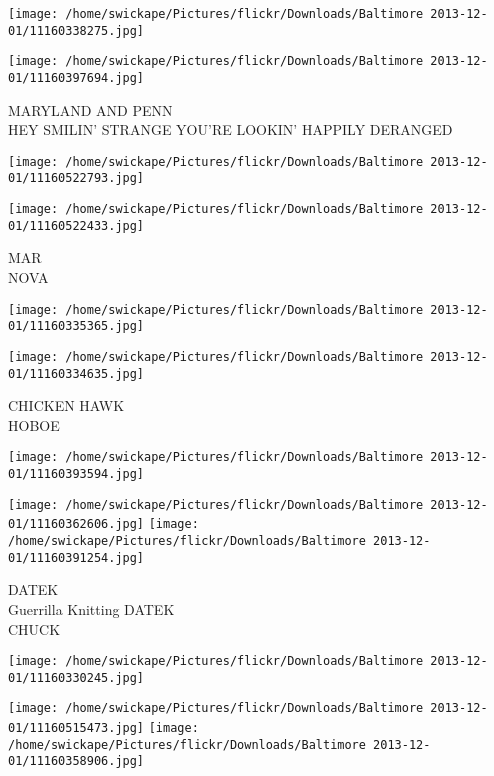 \documentclass[10pt,letterpaper]{article}
\begin{document}
\texttt{[image: /home/swickape/Pictures/flickr/Downloads/Baltimore 2013-12-01/11160338275.jpg]}

\vspace{0.25in}
\texttt{[image: /home/swickape/Pictures/flickr/Downloads/Baltimore 2013-12-01/11160397694.jpg]}

MARYLAND AND PENN\\
HEY SMILIN' STRANGE YOU'RE LOOKIN' HAPPILY DERANGED
\pagebreak

\texttt{[image: /home/swickape/Pictures/flickr/Downloads/Baltimore 2013-12-01/11160522793.jpg]}

\vspace{0.25in}
\texttt{[image: /home/swickape/Pictures/flickr/Downloads/Baltimore 2013-12-01/11160522433.jpg]}

MAR\\
NOVA
\pagebreak

\texttt{[image: /home/swickape/Pictures/flickr/Downloads/Baltimore 2013-12-01/11160335365.jpg]}

\vspace{0.25in}
\texttt{[image: /home/swickape/Pictures/flickr/Downloads/Baltimore 2013-12-01/11160334635.jpg]}

CHICKEN HAWK\\
HOBOE
\pagebreak

\texttt{[image: /home/swickape/Pictures/flickr/Downloads/Baltimore 2013-12-01/11160393594.jpg]}

\vspace{0.25in}
\texttt{[image: /home/swickape/Pictures/flickr/Downloads/Baltimore 2013-12-01/11160362606.jpg]}
\texttt{[image: /home/swickape/Pictures/flickr/Downloads/Baltimore 2013-12-01/11160391254.jpg]}

DATEK\\
Guerrilla Knitting DATEK\\
CHUCK
\pagebreak

\texttt{[image: /home/swickape/Pictures/flickr/Downloads/Baltimore 2013-12-01/11160330245.jpg]}

\vspace{0.25in}
\texttt{[image: /home/swickape/Pictures/flickr/Downloads/Baltimore 2013-12-01/11160515473.jpg]}
\texttt{[image: /home/swickape/Pictures/flickr/Downloads/Baltimore 2013-12-01/11160358906.jpg]}
\end{document}
